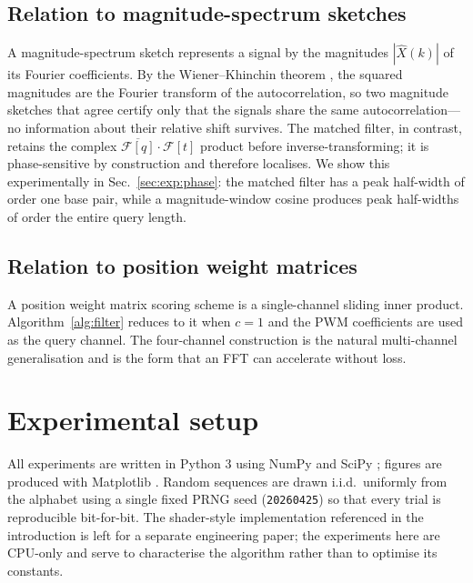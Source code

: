 \documentclass[11pt,a4paper]{article}
\theoremstyle{definition}
\theoremstyle{remark}
\newcommand{\F}{\mathcal{F}}
\begin{document}
\subsection{Relation to magnitude-spectrum sketches}
\label{sec:method:phase}

A magnitude-spectrum sketch represents a signal by the magnitudes
$|\hat X(k)|$ of its Fourier coefficients. By the Wiener--Khinchin
theorem \citep{wiener1930, khinchin1934}, the squared magnitudes are
the Fourier transform of the autocorrelation, so two magnitude
sketches that agree certify only that the signals share the same
autocorrelation---no information about their relative shift survives.
The matched filter, in contrast, retains the complex
$\overline{\F[q]} \cdot \F[t]$ product before inverse-transforming; it
is phase-sensitive by construction and therefore localises. We show
this experimentally in Sec.~\ref{sec:exp:phase}: the matched filter has
a peak half-width of order one base pair, while a magnitude-window
cosine produces peak half-widths of order the entire query length.

\subsection{Relation to position weight matrices}

A position weight matrix scoring scheme is a single-channel sliding inner
product. Algorithm~\ref{alg:filter} reduces to it when $c = 1$ and the
PWM coefficients are used as the query channel. The four-channel
construction is the natural multi-channel generalisation and is the
form that an FFT can accelerate without loss.

\section{Experimental setup}
\label{sec:setup}

All experiments are written in Python 3 using NumPy
\citep{harris2020numpy} and SciPy \citep{virtanen2020scipy}; figures
are produced with Matplotlib \citep{hunter2007matplotlib}. Random
sequences are drawn i.i.d.\ uniformly from the alphabet using a single
fixed PRNG seed (\verb|20260425|) so that every trial is reproducible
bit-for-bit. The shader-style implementation referenced in the
introduction is left for a separate engineering paper; the experiments
here are CPU-only and serve to characterise the algorithm rather than
to optimise its constants.
\end{document}
